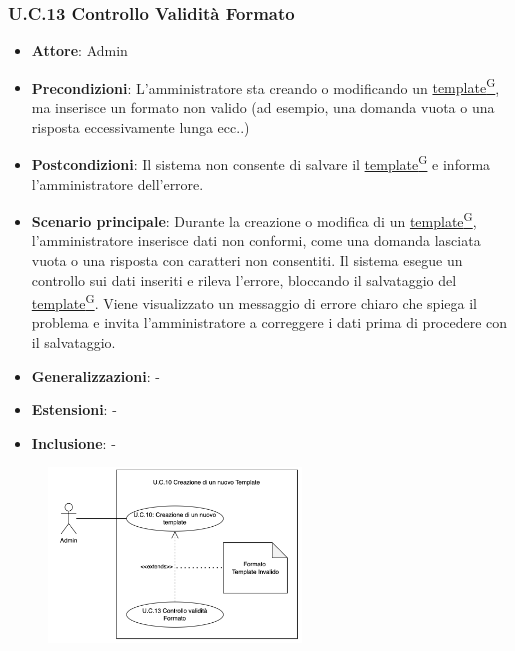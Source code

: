 \subsubsection{U.C.13 Controllo Validità Formato}
\begin{itemize}
    \item \textbf{Attore}: Admin
    \item \textbf{Precondizioni}: L'amministratore sta creando o modificando un \href{https://code7crusaders.github.io/docs/RTB/documentazione_interna/glossario.html#template}{template\textsuperscript{G}}, ma inserisce un formato non valido (ad esempio, una domanda vuota o una risposta eccessivamente lunga ecc..)
    \item \textbf{Postcondizioni}: Il sistema non consente di salvare il \href{https://code7crusaders.github.io/docs/RTB/documentazione_interna/glossario.html#template}{template\textsuperscript{G}} e informa l'amministratore dell'errore.
    \item \textbf{Scenario principale}: Durante la creazione o modifica di un \href{https://code7crusaders.github.io/docs/RTB/documentazione_interna/glossario.html#template}{template\textsuperscript{G}}, l'amministratore inserisce dati non conformi, come una domanda lasciata vuota o una risposta con caratteri non consentiti. Il sistema esegue un controllo sui dati inseriti e rileva l'errore, bloccando il salvataggio del \href{https://code7crusaders.github.io/docs/RTB/documentazione_interna/glossario.html#template}{template\textsuperscript{G}}. Viene visualizzato un messaggio di errore chiaro che spiega il problema e invita l'amministratore a correggere i dati prima di procedere con il salvataggio.
    \item \textbf{Generalizzazioni}: -
    \item \textbf{Estensioni}: -
    \item \textbf{Inclusione}: -
\end{itemize}
\begin{figure}[H]
    \centering
    \includegraphics[width=0.6\textwidth]{img/UC13.1.png}
\end{figure}
